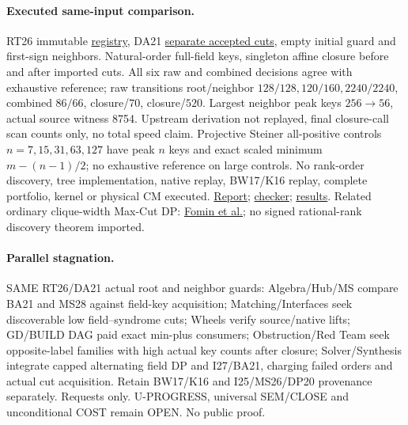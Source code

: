 \documentclass[11pt]{article}
\begin{document}
\paragraph{Executed same-input comparison.} RT26 immutable \href{https://github.com/j15marti/pnp/commit/85e959ac861572a2411b9858da0d58d7c72ac780}{registry}, DA21 \href{https://github.com/j15marti/pnp/commit/6d9917749c8438435d889b31e5c81ed0fc410e9a}{separate accepted cuts}, empty initial guard and first-sign neighbors. Natural-order full-field keys, singleton affine closure before and after imported cuts. All six raw and combined decisions agree with exhaustive reference; raw transitions root/neighbor $128/128,120/160,2240/2240$, combined $86/66$, closure/$70$, closure/$520$. Largest neighbor peak keys $256\to56$, actual source witness 8754. Upstream derivation not replayed, final closure-call scan counts only, no total speed claim. Projective Steiner all-positive controls $n=7,15,31,63,127$ have peak $n$ keys and exact scaled minimum $m-(n-1)/2$; no exhaustive reference on large controls. No rank-order discovery, tree implementation, native replay, BW17/K16 replay, complete portfolio, kernel or physical CM executed. \href{https://github.com/j15marti/pnp/commit/10082bb02c26010ce9b7993430702d05cb33a870}{Report}; \href{https://github.com/j15marti/pnp/commit/11751af0d6a59bb0d710efa33ca512f9d52e5f76}{checker}; \href{https://github.com/j15marti/pnp/commit/9dfaae3644c1fb125bfdfb7a96c30f60567ba7c9}{results}. Related ordinary clique-width Max-Cut DP: \href{https://doi.org/10.1137/130910932}{Fomin et al.}; no signed rational-rank discovery theorem imported.
\paragraph{Parallel stagnation.} SAME RT26/DA21 actual root and neighbor guards: Algebra/Hub/MS compare BA21 and MS28 against field-key acquisition; Matching/Interfaces seek discoverable low field--syndrome cuts; Wheels verify source/native lifts; GD/BUILD DAG paid exact min-plus consumers; Obstruction/Red Team seek opposite-label families with high actual key counts after closure; Solver/Synthesis integrate capped alternating field DP and I27/BA21, charging failed orders and actual cut acquisition. Retain BW17/K16 and I25/MS26/DP20 provenance separately. Requests only. U-PROGRESS, universal SEM/CLOSE and unconditional COST remain OPEN. No public proof.
\end{document}
